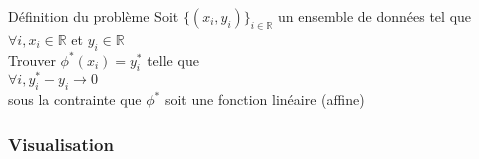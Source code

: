 \begin{frame}{Définition du problème}
  Soit $\{( x_i , y_i)\}_{i \in \mathbb{R}}$ un ensemble de données tel que $\forall i, x_i \in \mathbb{R}$ et $y_i \in \mathbb{R}$ \\
  \newline
  Trouver $\phi^*(x_i) = y_i^*$ telle que \\
  \newline
  $\forall i, y^*_i-y_i \rightarrow 0$ \\
  sous la contrainte que $\phi^*$ soit une fonction linéaire (affine)
\end{frame}

\begin{frame}
  \frametitle{Visualisation}
\end{frame}
